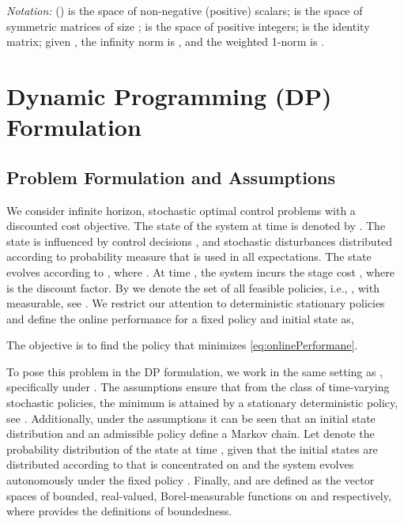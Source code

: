 \documentclass[journal]{IEEEtran}
\begin{document}
\emph{Notation:}
 () is the space of non-negative (positive) scalars;
 is the space of symmetric matrices of size ;
 is the space of positive integers;
 is the  identity matrix;
given , the infinity norm is , and the weighted 1-norm is . 



\section{Dynamic Programming (DP) Formulation} \label{sec:dp}


\subsection{Problem Formulation and Assumptions} \label{sec:dp_prob_form_and_assumptions}


We consider infinite horizon, stochastic optimal control problems with a discounted cost objective. The state of the system at time  is denoted by  .
The state is influenced by control decisions , and stochastic disturbances  distributed according to probability measure  that is used in all expectations.
The state evolves according to , where .
At time , the system incurs the stage cost , where  is the discount factor.
By  we denote the set of all feasible policies, i.e., , with  measurable, see \cite[Definition 2.2.3]{hernandez_2012_discreteTimeMCP}.
We restrict our attention to deterministic stationary policies and define the online performance for a fixed policy and initial state  as,
	
The objective is to find the policy that minimizes \eqref{eq:onlinePerformane}.


To pose this problem in the DP formulation, we work in the same setting as \cite[Section 6.3]{hernandez_2012_discreteTimeMCP}, specifically under \cite[Assumptions 4.2.1(a), 4.2.1(b), 4.2.2]{hernandez_2012_discreteTimeMCP}.
The assumptions ensure that from the class of time-varying stochastic policies, the minimum is attained by a stationary deterministic policy, see \cite[Theorem 4.2.3]{hernandez_2012_discreteTimeMCP}.
Additionally, under the assumptions it can be seen that an initial state distribution  and an admissible policy  define a Markov chain. Let  denote the probability distribution of the state at time , given that the initial states are distributed according to  that is concentrated on  and the system evolves autonomously under the fixed policy .
Finally,  and  are defined as the vector spaces of bounded, real-valued, Borel-measurable functions on  and  respectively, where \cite[Definition 6.3.2, 6.3.4]{hernandez_2012_discreteTimeMCP} provides the definitions of boundedness.
\end{document}

